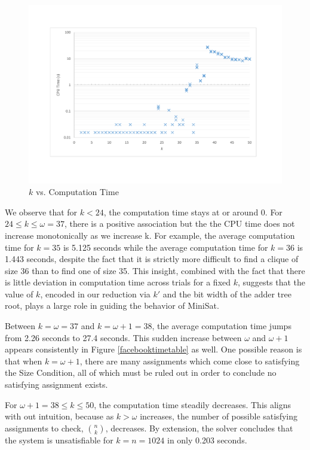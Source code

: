\documentclass[]{article}
\begin{document}
	\begin{figure}[H]
		\caption{$k$ vs. Computation Time}
		\includegraphics[width=4.5 in]{graph2}
		\centering
	\end{figure}
	
	We observe that for $k < 24$, the computation time stays at or around 0. For $24 \le k \le \omega = 37$, there is a positive association but the the CPU time does not increase monotonically as we increase k. For example, the average computation time for $k = 35$ is 5.125 seconds while the average computation time for $k = 36$ is 1.443 seconds, despite the fact that it is strictly more difficult to find a clique of size 36 than to find one of size 35. This insight, combined with the fact that there is little deviation in computation time across trials for a fixed $k$, suggests that the value of $k$, encoded in our reduction via $k'$ and the bit width of the adder tree root, plays a large role in guiding the behavior of MiniSat.
	
	Between $k = \omega = 37$ and $k = \omega + 1 = 38$, the average computation time jumps from 2.26 seconds to 27.4 seconds. This sudden increase between $\omega$ and $\omega + 1$ appears consistently in Figure \ref{facebooktimetable} as well. One possible reason is that when $k = \omega + 1$, there are many assignments which come close to satisfying the Size Condition, all of which must be ruled out in order to conclude no satisfying assignment exists.
	
	For $\omega + 1 = 38 \le k \le 50$, the computation time steadily decreases. This aligns with out intuition, because as $k > \omega$ increases, the number of possible satisfying assignments to check, $\binom{n}{k}$, decreases. By extension, the solver concludes that the system is unsatisfiable for $k = n = 1024$ in only 0.203 seconds.
	
\end{document}
